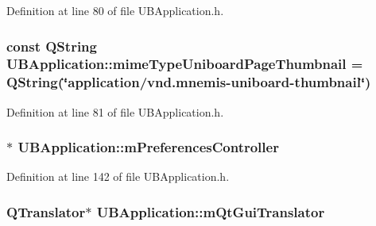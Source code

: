 Definition at line 80 of file U\-B\-Application.\-h.

\hypertarget{class_u_b_application_a54fdf1ac617534985723e5d3db992f74}{
\subsubsection[{mime\-Type\-Uniboard\-Page\-Thumbnail}]{\setlength{\rightskip}{0pt plus 5cm}const Q\-String U\-B\-Application\-::mime\-Type\-Uniboard\-Page\-Thumbnail = Q\-String(\char`\"{}application/vnd.\-mnemis-\/uniboard-\/thumbnail\char`\"{})\hspace{0.3cm}{\ttfamily [static]}}}\label{d8/d81/class_u_b_application_a54fdf1ac617534985723e5d3db992f74}


Definition at line 81 of file U\-B\-Application.\-h.

\hypertarget{class_u_b_application_ad4d9564178f1df0dc4d29b8d3633cbb4}{
\subsubsection[{m\-Preferences\-Controller}]{$\ast$ U\-B\-Application\-::m\-Preferences\-Controller\hspace{0.3cm}{\ttfamily [protected]}}}\label{d8/d81/class_u_b_application_ad4d9564178f1df0dc4d29b8d3633cbb4}


Definition at line 142 of file U\-B\-Application.\-h.

\hypertarget{class_u_b_application_a3d5c72ac49324dac33f7aebfbb4859f3}{
\subsubsection[{m\-Qt\-Gui\-Translator}]{\setlength{\rightskip}{0pt plus 5cm}Q\-Translator$\ast$ U\-B\-Application\-::m\-Qt\-Gui\-Translator\hspace{0.3cm}{\ttfamily [protected]}}}\label{d8/d81/class_u_b_application_a3d5c72ac49324dac33f7aebfbb4859f3}


